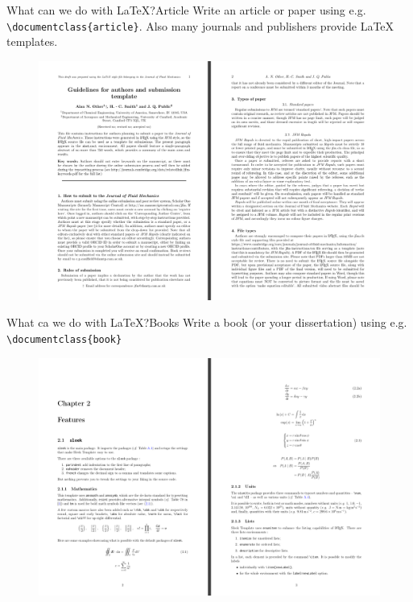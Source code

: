 \documentclass[presentation, aspectratio=1610]{beamer}
\begin{document}
\begin{frame}{What can we do with \LaTeX{}?}{Article}
  Write an article or paper using e.g. \texttt{\textbackslash{}documentclass\{article\}}. Also many journals and publishers
  provide \LaTeX{} templates.
  \begin{figure}
    \centering
    \includegraphics[width=\textheight]{article_example2}
  \end{figure}
\end{frame}

\begin{frame}{What ca we do with \LaTeX{}?}{Books}
  Write a book (or your dissertation) using e.g. \texttt{\textbackslash{}documentclass\{book\}}
  \begin{figure}
    \centering
    \includegraphics[width=\textheight]{book_example2}
  \end{figure}
\end{frame}
\end{document}
